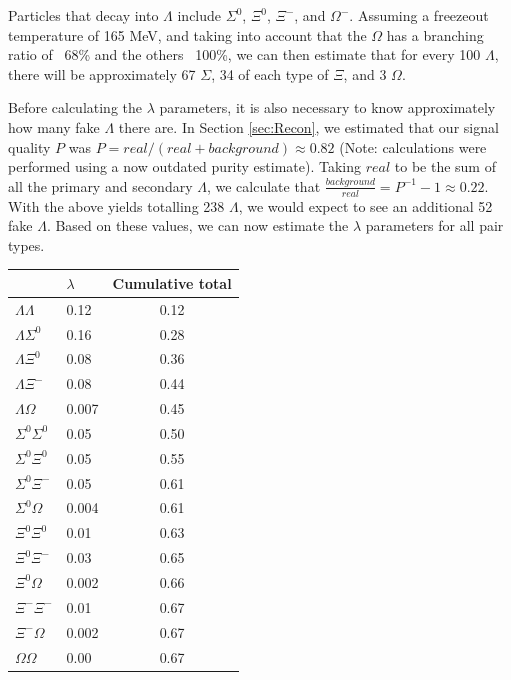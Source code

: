 Particles that decay into $\Lambda$ include $\Sigma^0$, $\Xi^0$, $\Xi^-$, and $\Omega^-$.  Assuming a freezeout temperature of 165 MeV, and taking into account that the $\Omega$ has a branching ratio of ~68\% and the others ~100\%, we can then estimate that for every 100 $\Lambda$, there will be approximately 67 $\Sigma$, 34 of each type of $\Xi$, and 3 $\Omega$.

Before calculating the $\lambda$ parameters, it is also necessary to know approximately how many fake $\Lambda$ there are.  In Section \ref{sec:Recon}, we estimated that our signal quality $P$ was $P = real/(real + background) \approx 0.82$ (Note: calculations were performed using a now outdated purity estimate).  Taking $real$ to be the sum of all the primary and secondary $\Lambda$, we calculate that $\frac{background}{real} = P^{-1}-1 \approx 0.22$.  With the above yields totalling 238 $\Lambda$, we would expect to see an additional 52 fake $\Lambda$.  Based on these values, we can now estimate the $\lambda$ parameters for all pair types.

\begin{center}
\begin{tabular}{|l|l|c|}
\hline
					& 	$\lambda$	&	Cumulative total \\ \hline
$\Lambda\Lambda$   	&	0.12			&	0.12 \\ \hline
$\Lambda\Sigma^0$  	&	0.16			&	0.28 \\ \hline
$\Lambda\Xi^0$     	&	0.08			&	0.36 \\ \hline
$\Lambda\Xi^-$     	&	0.08			&	0.44 \\ \hline
$\Lambda\Omega$    	&	0.007		&	0.45 \\ \hline
$\Sigma^0\Sigma^0$ 	&	0.05			&	0.50 \\ \hline
$\Sigma^0\Xi^0$    	&	0.05			&	0.55 \\ \hline
$\Sigma^0\Xi^-$    	&	0.05			&	0.61 \\ \hline
$\Sigma^0\Omega$   	&	0.004		&	0.61 \\ \hline
$\Xi^0\Xi^0$       	&	0.01			&	0.63 \\ \hline
$\Xi^0\Xi^-$ 		&	0.03			&	0.65 \\ \hline
$\Xi^0\Omega$ 		&	0.002		&	0.66 \\ \hline
$\Xi^-\Xi^-$ 		&	0.01			&	0.67 \\ \hline
$\Xi^-\Omega$ 		&	0.002		&	0.67 \\ \hline
$\Omega\Omega$ 		&	0.00			&	0.67 \\ \hline
\end{tabular}
\end{center}

